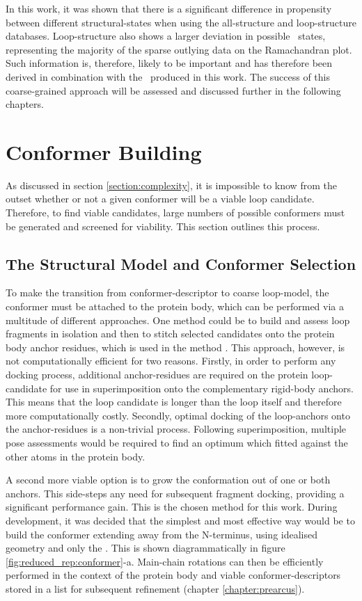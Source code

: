 In this work, it was shown that there is a significant difference in propensity between different structural-states when using the all-structure and loop-structure databases. Loop-structure also shows a larger deviation in possible \phipsi\
states, representing the majority of the sparse outlying data on the Ramachandran
plot.
Such information is, therefore, likely to be important and has therefore been derived in combination with the \angleset\ produced in this work. The success of this coarse-grained approach will be assessed and discussed further in the following chapters. 
  

\section{Conformer Building}

As discussed in section \ref{section:complexity}, it is impossible to know from the outset whether or not a given conformer will be a viable loop candidate. Therefore, to find viable candidates, large numbers of possible conformers must be generated and screened for viability. This section outlines this process.


\subsection{The Structural Model and Conformer Selection}

To make the transition from conformer-descriptor to coarse loop-model, the conformer must be attached to the protein body, which can be performed via a multitude of different approaches. One method could be to build and assess loop fragments in isolation and then to stitch selected candidates onto the protein body anchor residues, which is used in the method \petra\cite{METHOD:Petra}. This approach, however, is not computationally efficient for two reasons. Firstly, in order to perform any docking process, additional anchor-residues are required on the protein loop-candidate for use in superimposition onto the complementary rigid-body anchors. This means that the loop candidate is longer than the loop itself and therefore more computationally costly. Secondly, optimal docking of the loop-anchors  onto the anchor-residues is a non-trivial process. Following superimposition, multiple pose assessments would be required to find an optimum which fitted against the other atoms in the protein body. 

A second more viable option is to grow the conformation out of one or both anchors. This side-steps any need for subsequent fragment docking, providing a significant performance gain.  This is the chosen method for this work. During development, it was decided that the simplest and most effective way would be to build the conformer extending away from the N-terminus, using idealised geometry and only the \bbatoms. This is shown diagrammatically in figure \ref{fig:reduced_rep:conformer}-a. Main-chain rotations can then be efficiently performed in the context of the protein body and viable conformer-descriptors stored in a list for subsequent refinement (chapter \ref{chapter:prearcus}).
 
